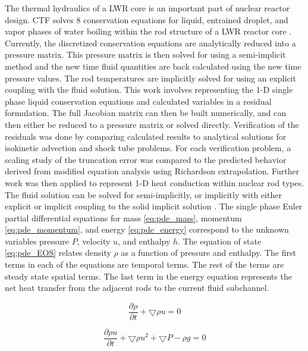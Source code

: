 	The thermal hydraulics of a LWR core is an important part of nuclear
	reactor design. CTF solves 8 conservation equations for liquid,
	entrained droplet, and vapor phases of water boiling within the rod structure
	of a LWR reactor core \cite{Salko2014}. Currently, the discretized conservation
	equations are analytically reduced into a pressure matrix. This pressure
	matrix is then solved for using a semi-implicit method and the new time
	fluid quantities are back calculated using the new time pressure values. The
	rod temperatures are implicitly solved for using an explicit coupling with the
	fluid solution.  This work involves representing the 1-D single phase liquid
	conservation equations and calculated variables in a residual formulation. The
	full Jacobian matrix can then be built numerically, and  can then either be
	reduced to a pressure matrix or solved directly. Verification of the residuals
	was done by comparing calculated results to analytical solutions for isokinetic
	advection and shock tube problems. For each verification problem, a scaling
	study of the truncation error was compared to the predicted behavior derived
	from modified equation analysis using Richardson extrapolation. Further work
	was then applied to represent 1-D heat conduction within nuclear rod types.
	The fluid solution can be solved for semi-implicitly, or implicitly with either
	explicit or implicit coupling to the solid implicit solution . The single phase
	Euler partial differential equations for mass \eqref{eq:pde_mass}, momentum
	\eqref{eq:pde_momentum}, and energy \eqref{eq:pde_energy} correspond to the
	unknown variables pressure $P$, velocity $u$, and enthalpy $h$. The equation
	of state \eqref{eq:pde_EOS} relates density $\rho$ as a function of pressure
	and enthalpy. The first terms in each of the equations are temporal terms. The
	rest of the terms are steady state spatial terms. The last term in the energy
	equation represents the net heat transfer from the adjacent rods to the
	current fluid subchannel.
    
    \begin{equation}
    	\label{eq:pde_mass}
    	\frac{ \partial \rho}{\partial t} + \bigtriangledown \rho u = 0
    \end{equation}
    
    \begin{equation}
    	\label{eq:pde_momentum}
    	\frac{ \partial \rho u}{\partial t} + \bigtriangledown \rho u^{2} +
    	\bigtriangledown P - \rho g  = 0
    \end{equation}
    
